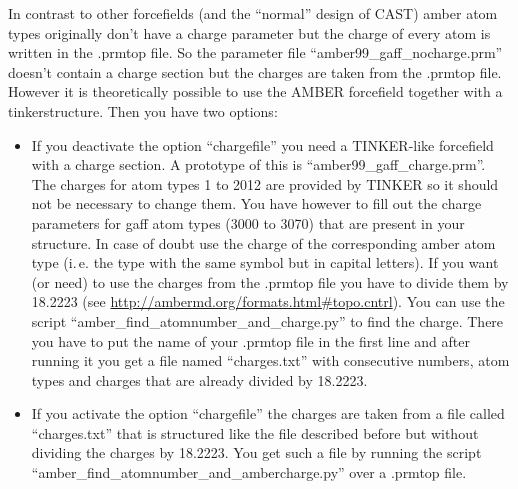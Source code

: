 \documentclass[10pt,a4paper]{article} %
\begin{document}
In contrast to other forcefields (and the ``normal'' design of CAST) amber atom types originally don't have a charge parameter but the charge of every atom is written in the .prmtop file. So the parameter file ``amber99\_gaff\_nocharge.prm'' doesn't contain a charge section but the charges are taken from the .prmtop file. However it is theoretically possible to use the AMBER forcefield together with a tinkerstructure. Then you have two options:
\begin{itemize}
\item If you deactivate the option ``chargefile'' you need a TINKER-like forcefield with a charge section. A prototype of this is ``amber99\_gaff\_charge.prm''. The charges for atom types 1 to 2012 are provided by TINKER so it should not be necessary to change them. You have however to fill out the charge parameters for gaff atom types (3000 to 3070) that are present in your structure. In case of doubt use the charge of the corresponding amber atom type (i.\,e. the type with the same symbol but in capital letters). If you want (or need) to use the charges from the .prmtop file you have to divide them by 18.2223 (see \url{http://ambermd.org/formats.html\#topo.cntrl}). You can use the script ``amber\_find\_atomnumber\_and\_charge.py'' to find the charge. There you have to put the name of your .prmtop file in the first line and after running it you get a file named ``charges.txt'' with consecutive numbers, atom types and charges that are already divided by 18.2223.
\item If you activate the option ``chargefile'' the charges are taken from a file called ``charges.txt'' that is structured like the file described before but without dividing the charges by 18.2223. You get such a file by running the script ``amber\_find\_atomnumber\_and\_ambercharge.py'' over a .prmtop file.
\end{itemize}


\end{document}
